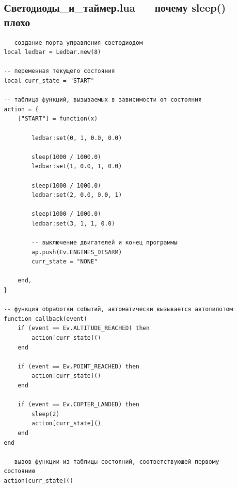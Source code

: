 \documentclass[a4paper,12pt]{article}
\begin{document}
\subsection{Светодиоды\_и\_таймер.lua — почему sleep() плохо}
\begin{lstlisting}[style=lua,caption={Светодиоды_и_таймер.lua}]
-- создание порта управления светодиодом
local ledbar = Ledbar.new(8)

-- переменная текущего состояния
local curr_state = "START"

-- таблица функций, вызываемых в зависимости от состояния
action = {
	["START"] = function(x)

		ledbar:set(0, 1, 0.0, 0.0)

		sleep(1000 / 1000.0) 
		ledbar:set(1, 0.0, 1, 0.0)

		sleep(1000 / 1000.0) 
		ledbar:set(2, 0.0, 0.0, 1)

		sleep(1000 / 1000.0) 
		ledbar:set(3, 1, 1, 0.0)

		-- выключение двигателей и конец программы
		ap.push(Ev.ENGINES_DISARM)
		curr_state = "NONE"

	end,
}

-- функция обработки событий, автоматически вызывается автопилотом
function callback(event)
	if (event == Ev.ALTITUDE_REACHED) then
		action[curr_state]()
	end

	if (event == Ev.POINT_REACHED) then
		action[curr_state]()
	end

	if (event == Ev.COPTER_LANDED) then
		sleep(2)
		action[curr_state]()
	end
end

-- вызов функции из таблицы состояний, соответствующей первому состоянию
action[curr_state]()
\end{lstlisting}
\end{document}
